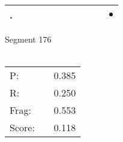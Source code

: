 \documentclass[landscape]{article}
\newcommand{\ssp}{\hspace{2pt}}
\newcommand{\mex}{\cellcolor{g}$\bullet$}
\begin{document}
\begin{tabular}{|l|p{10pt}|p{10pt}|p{10pt}|p{10pt}|p{10pt}|p{10pt}|p{10pt}|p{10pt}|p{10pt}|p{10pt}|}
\hline
\ssp \cellcolor{ref9}. \ssp&\hspace{2pt}&\hspace{2pt}&\hspace{2pt}&\hspace{2pt}&\hspace{2pt}&\hspace{2pt}&\hspace{2pt}&\hspace{2pt}&\hspace{2pt}&\hspace{2pt}\mex\\
\hline
\end{tabular}

\vspace{6pt}
\noindent Segment 176\\\\
\noindent\begin{tabular}{lm{12pt}r}
\hline
P:&&0.385\\
R:&&0.250\\
Frag:&&0.553\\
Score:&&0.118\\
\end{tabular}

\newpage
\end{document}
